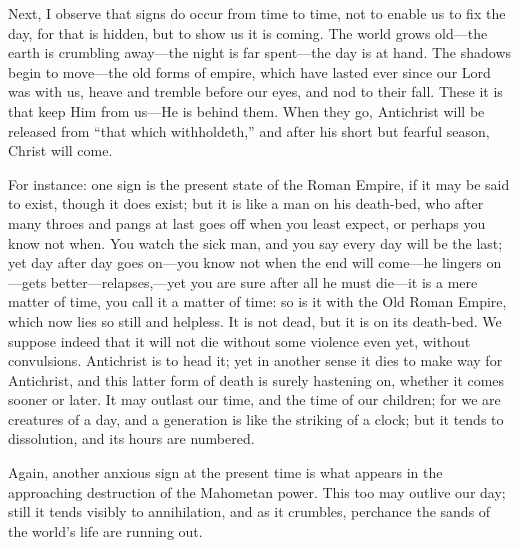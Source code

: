 Next, I observe that signs do occur from time to time, not to
enable us to fix the day, for that is hidden, but to show us it is
coming. The world grows old—the earth is crumbling away—the
night is far spent—the day is at hand. The shadows begin to move—the
old forms of empire, which have lasted ever since our Lord was with
us, heave and tremble before our eyes, and nod to their fall. These it
is that keep Him from us—He is behind them. When they go, Antichrist
will be released from ``that which withholdeth,'' and after
his short but fearful season, Christ will come.

For instance: one sign is the present state of the Roman Empire, if
it may be said to exist, though it does exist; but it is like a man on
his death-bed, who after many throes and pangs at last goes off when
you least expect, or perhaps you know not when. You watch the sick
man, and you say every day will be the last; yet day after day goes on—you
know not when the end will come—he lingers on—gets better—relapses,—yet
you are sure after all he must die—it is a mere matter of time, you
call it a matter of time: so is it with the Old Roman Empire, which
now lies so still and helpless. It is not dead, but it is on its
death-bed. We suppose indeed that it will not die without some
violence even yet, without convulsions. Antichrist is to head it; yet
in another sense it dies to make way for Antichrist, and this latter
form of death is surely hastening on, whether it comes sooner or
later. It may outlast our time, and the time of our children; for we
are creatures of a day, and a generation is like the striking of a
clock; but it tends to dissolution, and its hours are numbered.

Again, another anxious sign at the present time is what appears in
the approaching destruction of the Mahometan power. This too may
outlive our day; still it tends visibly to annihilation, and as it
crumbles, perchance the sands of the world's life are running out.

